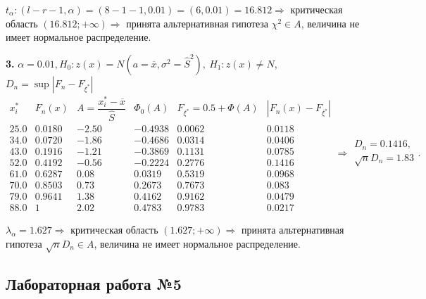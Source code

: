 \documentclass[9pt]{article}
\begin{document}
\par\(t_\alpha: (l-r-1,\alpha)=(8-1-1,0.01)=(6,0.01)=16.812\Rightarrow\) критическая область \((16.812;+\infty)\Rightarrow\) принята альтернативная гипотеза \(\chi^2\in A\), величина не имеет нормальное распределение.
\par\textbf{3.} \(\alpha=0.01,H_0:z(x)=N(a=\overline x,\sigma^2=\hat S^2),\ H_1:z(x)\neq N\), \(D_n=\sup|F_n-F_{\xi^*}|\)
\[\begin{array}{c|c|c|c|c|c}
    x_i^* & F_n(x) & A=\dfrac{x_i^*-\overline x}{\hat S} & \Phi_0(A) & F_{\xi^*}=0.5+\Phi(A) & |F_n(x)-F_{\xi^*}|\\
    \hline 
    25.0 & 0.0180 & -2.50 & -0.4938 & 0.0062 & 0.0118\\
    34.0 & 0.0720 & -1.86 & -0.4686 & 0.0314 & 0.0406\\
    43.0 & 0.1916 & -1.21 & -0.3869 & 0.1131 & 0.0785\\
    52.0 & 0.4192 & -0.56 & -0.2224 & 0.2776 & 0.1416\\
    61.0 & 0.6287 & 0.08 & 0.0319 & 0.5319 & 0.0968\\
    70.0 & 0.8503 & 0.73 & 0.2673 & 0.7673 & 0.083\\
    79.0 & 0.9641 & 1.38 & 0.4162 & 0.9162 & 0.0479\\
    88.0 & 1 & 2.02 & 0.4783 & 0.9783 & 0.0217
\end{array}\Rightarrow 
\begin{array}{cc}
    D_n=0.1416, \\
    \sqrt{n}D_n=1.83
\end{array}.\]
\par\(\lambda_\alpha=1.627\Rightarrow\) критическая область \((1.627;+\infty)\Rightarrow\) принята альтернативная гипотеза \(\sqrt{n}D_n\in A\), величина не имеет нормальное распределение.

\subsection{Лабораторная работа №5}
\end{document}
